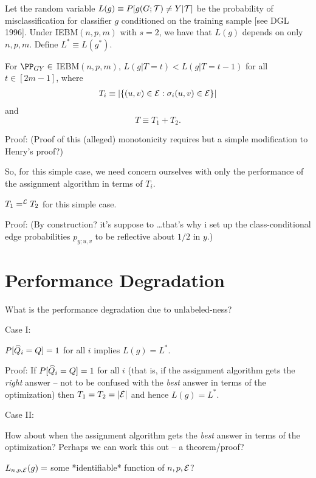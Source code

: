 
Let the random variable $L(g) \equiv P[g(G;\mathcal{T}) \neq Y| \mathcal{T}]$
be the probability of misclassification for classifier $g$
conditioned on the training sample [see DGL 1996].
Under IEBM$(n,p,m)$ with $s=2$, we have that $L(g)$ depends on only $n,p,m$.
Define $L^* \equiv L(g^*)$.

\thma
For $\PP_{GY} \in$ IEBM$(n,p,m)$,
$L(g|T=t) < L(g|T=t-1)$ for all $t \in [2m-1]$,
where
\begin{eqnarray}
T_i \equiv |\{(u,v) \in \mathcal{E}: \sigma_i(u,v) \in \mathcal{E}\}|
\end{eqnarray}
and
$$T \equiv T_1 + T_2.$$
\thmb

Proof:
(Proof of this (alleged) monotonicity requires but a simple modification to Henry's proof?)

So, for this simple case,
we need concern ourselves with only the performance of the assignment algorithm in terms of $T_i$.

\thma
$T_1 =^{\mathcal{L}} T_2$ for this simple case.
\thmb

Proof:
(By construction? it's suppose to \dots that's why i set up the class-conditional edge probabilities
 $p_{y;u,v}$ to be reflective about $1/2$ in $y$.)




\section{Performance Degradation}

What is the performance degradation due to unlabeled-ness?

Case I:

\thma
$P[\widehat{Q}_i = Q]=1$ for all $i$ implies $L(g)=L^*$.
\thmb

Proof:
If $P[\widehat{Q}_i = Q]=1$ for all $i$
(that is, if the assignment algorithm gets the {\em right} answer --
not to be confused with the {\em best} answer
in terms of the optimization)
then $T_1=T_2=|\mathcal{E}|$ and hence $L(g)=L^*$.


Case II:

How about when the assignment algorithm gets the {\em best} answer
in terms of the optimization?
Perhaps we can work this out -- a theorem/proof?

\thma
$L_{n,p,\mathcal{E}}(g) =$ some *identifiable* function of $n,p,\mathcal{E}$?
\thmb

